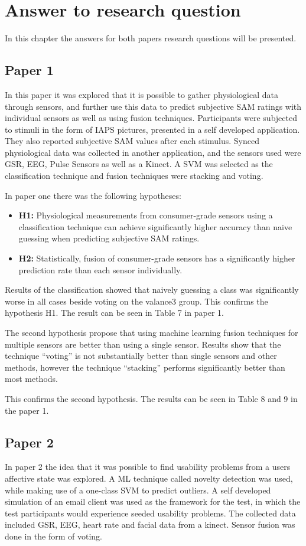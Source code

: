 \chapter{Answer to research question}
In this chapter the answers for both papers research questions will be presented.
\section{Paper 1}
In this paper it was explored that it is possible to gather physiological data through sensors, and further use this data to predict subjective SAM ratings with individual sensors as well as using fusion techniques. 
Participants were subjected to stimuli in the form of IAPS pictures, presented in a self developed application. 
They also reported subjective SAM values after each stimulus. 
Synced physiological data was collected in another application, and the sensors used were GSR, EEG, Pulse Sensors as well as a Kinect.
A SVM was selected as the classification technique and fusion techniques were stacking and voting.

In paper one there was the following hypotheses:
\begin{itemize}
    \item \textbf{H1:} Physiological measurements from consumer-grade sensors using a classification technique can achieve significantly higher accuracy than naive guessing when predicting subjective SAM ratings.
    \item \textbf{H2:} Statistically, fusion of consumer-grade sensors has a significantly
higher prediction rate than each sensor individually.
\end{itemize}

Results of the classification showed that naively guessing a class was significantly worse in all cases beside voting on the valance3 group. 
This confirms the hypothesis H1. The result can be seen in Table 7 in paper 1.

The second hypothesis propose that using machine learning fusion techniques for multiple sensors are better than using a single sensor. 
Results show that the technique ``voting'' is not substantially better than single sensors and other methods, however the technique ``stacking'' performs significantly better than most methods. 

This confirms the second hypothesis. The results can be seen in Table 8 and 9 in the paper 1.

\section{Paper 2}
In paper 2 the idea that it was possible to find usability problems from a users affective state was explored. 
A ML technique called novelty detection was used, while making use of a one-class SVM to predict outliers.
A self developed simulation of an email client was used as the framework for the test, in which the test participants would experience seeded usability problems.
The collected data included GSR, EEG, heart rate and facial data from a kinect. 
Sensor fusion was done in the form of voting.

